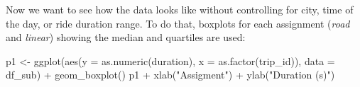 \documentclass[
]{article}
\newenvironment{Shaded}{\begin{snugshade}}{\end{snugshade}}
\newcommand{\AttributeTok}[1]{\textcolor[rgb]{0.77,0.63,0.00}{#1}}
\newcommand{\CommentTok}[1]{\textcolor[rgb]{0.56,0.35,0.01}{\textit{#1}}}
\newcommand{\FunctionTok}[1]{\textcolor[rgb]{0.00,0.00,0.00}{#1}}
\newcommand{\NormalTok}[1]{#1}
\newcommand{\OtherTok}[1]{\textcolor[rgb]{0.56,0.35,0.01}{#1}}
\newcommand{\SpecialCharTok}[1]{\textcolor[rgb]{0.00,0.00,0.00}{#1}}
\newcommand{\StringTok}[1]{\textcolor[rgb]{0.31,0.60,0.02}{#1}}
\begin{document}
\begin{Shaded}
\end{Shaded}

Now we want to see how the data looks like without controlling for city,
time of the day, or ride duration range. To do that, boxplots for each
assignment (\emph{road} and \emph{linear}) showing the median and
quartiles are used:

\begin{Shaded}
\begin{Highlighting}[]
\NormalTok{p1 }\OtherTok{\textless{}{-}} \FunctionTok{ggplot}\NormalTok{(}\FunctionTok{aes}\NormalTok{(}\AttributeTok{y =} \FunctionTok{as.numeric}\NormalTok{(duration), }\AttributeTok{x =} \FunctionTok{as.factor}\NormalTok{(trip\_id)), }
             \AttributeTok{data =}\NormalTok{ df\_sub) }\SpecialCharTok{+} \FunctionTok{geom\_boxplot}\NormalTok{()}
\NormalTok{p1 }\SpecialCharTok{+} \FunctionTok{xlab}\NormalTok{(}\StringTok{"Assigment"}\NormalTok{) }\SpecialCharTok{+} \FunctionTok{ylab}\NormalTok{(}\StringTok{"Duration (s)"}\NormalTok{) }
\end{Highlighting}
\end{Shaded}
\end{document}
